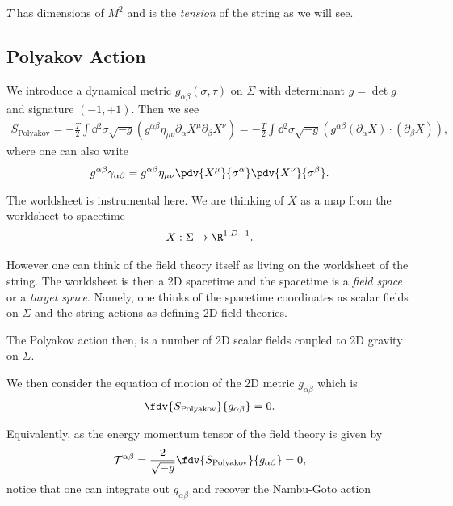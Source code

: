 $T$ has dimensions of $M^2$ and is the \emph{tension} of the string as we will see.

\subsection{Polyakov Action}

We introduce a dynamical metric $g_{\alpha \beta}\left( \sigma, \tau \right) $ on $\Sigma$ with determinant $g = \det g$ and signature $\left( -1,+1\right) $. Then we see
\begin{align}
    S_{\text{Polyakov}} = -\frac{T}{2} \int \dd{^2\sigma} \sqrt{-g} \left( g^{\alpha \beta} \eta_{\mu \nu}\partial_\alpha X^{\mu} \partial_\beta X^{\nu} \right)   = -\frac{T}{2} \int \dd{^2\sigma} \sqrt{-g} \left( g^{\alpha \beta} \left( \partial_\alpha X \right) \cdot  \left(  \partial_\beta X \right)  \right)
,\end{align}
where one can also write
\begin{align}
    g^{\alpha \beta} \gamma_{\alpha \beta} = g^{\alpha \beta} \eta_{\mu \nu}  \pdv{X^{\mu}}{\sigma^{\alpha}} \pdv{X^{\nu}}{\sigma^{\beta}}
.\end{align}

\begin{note}
    The worldsheet is instrumental here. We are thinking of $X$ as a map from the worldsheet to spacetime
    \begin{align}
        X : \Sigma \to \R^{1, D - 1}
    .\end{align}

    However one can think of the field theory itself as living on the worldsheet of the string. The worldsheet is then a 2D spacetime and the spacetime is a \textit{field space} or a \textit{target space}. Namely, one thinks of the spacetime coordinates as scalar fields on $\Sigma$ and the string actions as defining 2D field theories.

    The Polyakov action then, is a number of 2D scalar fields coupled to 2D gravity on $\Sigma$.
\end{note}

We then consider the equation of motion of the 2D metric $g_{\alpha \beta}$ which is
\begin{align}
    \fdv{S_\text{Polyakov}}{g_{\alpha \beta}} = 0
.\end{align}

Equivalently, as the energy momentum tensor of the field theory is given by
\begin{align}
    \mathcal{T}^{\alpha \beta} = \frac{2}{\sqrt{-g} } \fdv{S_\text{Polyakov}}{g_{\alpha \beta}} = 0
,\end{align}
notice that one can integrate out $g_{\alpha \beta}$ and recover the Nambu-Goto action









